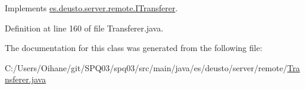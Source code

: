Implements \hyperlink{interfacees_1_1deusto_1_1server_1_1remote_1_1_i_transferer_ab43399cfce0d84f6e27032a7c14865f6}{es.\+deusto.\+server.\+remote.\+I\+Transferer}.



Definition at line 160 of file Transferer.\+java.



The documentation for this class was generated from the following file\+:\begin{DoxyCompactItemize}
\item 
C\+:/\+Users/\+Oihane/git/\+S\+P\+Q03/spq03/src/main/java/es/deusto/server/remote/\hyperlink{_transferer_8java}{Transferer.\+java}\end{DoxyCompactItemize}
